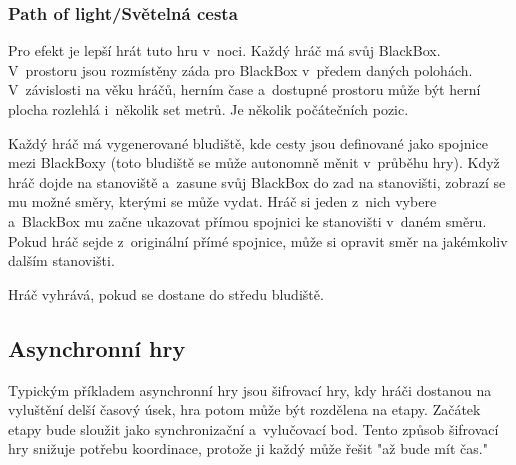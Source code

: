 \subsubsection{Path of light/Světelná cesta}

Pro efekt je lepší hrát tuto hru v~noci.
Každý hráč má svůj BlackBox.
V~prostoru jsou rozmístěny záda pro BlackBox v~předem daných polohách.
V~závislosti na věku hráčů, herním čase a~dostupné prostoru může být herní plocha rozlehlá i~několik set metrů.
Je několik počátečních pozic.

Každý hráč má vygenerované bludiště, kde cesty jsou definované jako spojnice mezi BlackBoxy (toto bludiště se může autonomně měnit v~průběhu hry).
Když hráč dojde na stanoviště a~zasune svůj BlackBox do zad na stanovišti, zobrazí se mu možné směry, kterými se může vydat.
Hráč si jeden z~nich vybere a~BlackBox mu začne ukazovat přímou spojnici ke stanovišti v~daném směru.
Pokud hráč sejde z~originální přímé spojnice, může si opravit směr na jakémkoliv dalším stanovišti.

Hráč vyhrává, pokud se dostane do středu bludiště.


\subsection{Asynchronní hry}

Typickým příkladem asynchronní hry jsou šifrovací hry, kdy hráči dostanou na vyluštění delší časový úsek, hra potom může být rozdělena na etapy.
Začátek etapy bude sloužit jako synchronizační a~vylučovací bod.
Tento způsob šifrovací hry snižuje potřebu koordinace, protože ji každý může řešit "až bude mít čas."

